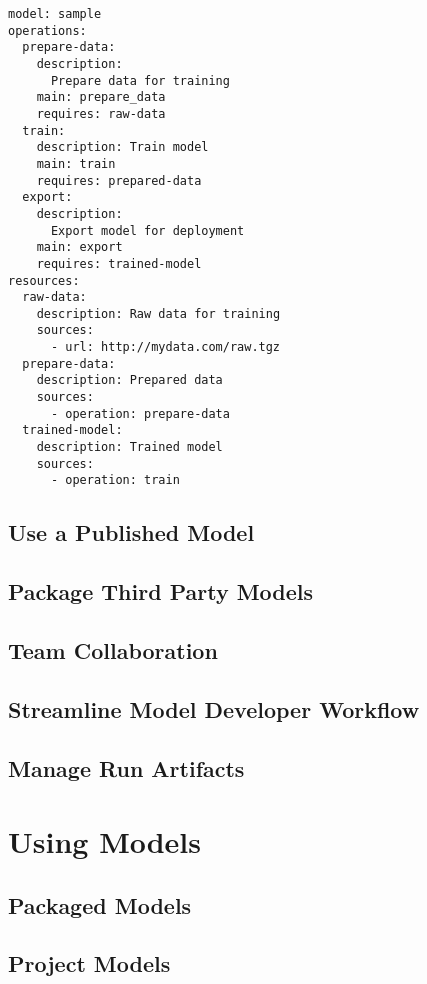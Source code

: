 \documentclass{article}
\begin{document}
\begin{lstlisting}[caption=whatever,label={lst:published-model}]
model: sample
operations:
  prepare-data:
    description:
      Prepare data for training
    main: prepare_data
    requires: raw-data
  train:
    description: Train model
    main: train
    requires: prepared-data
  export:
    description:
      Export model for deployment
    main: export
    requires: trained-model
resources:
  raw-data:
    description: Raw data for training
    sources:
      - url: http://mydata.com/raw.tgz
  prepare-data:
    description: Prepared data
    sources:
      - operation: prepare-data
  trained-model:
    description: Trained model
    sources:
      - operation: train
\end{lstlisting}


\subsection{Use a Published Model}

\subsection{Package Third Party Models}
\label{sec:package-maintainer}

\subsection{Team Collaboration}

\subsection{Streamline Model Developer Workflow}
\label{sec:streamline-workflow}

\subsection{Manage Run Artifacts}

\section{Using Models}

\subsection{Packaged Models}

\subsection{Project Models}
\end{document}
